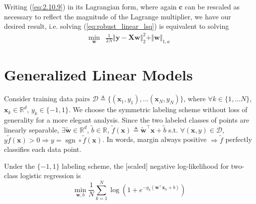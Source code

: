 \documentclass{article}
\numberwithin{equation}{section}
\begin{document}
Writing (\ref{eq:2.10.9}) in its Lagrangian form, where again $ \mathbf{c} $
can be rescaled as necessary to reflect the magnitude of the Lagrange
multiplier, we have our desired result, i.e. solving
(\ref{eq:robust_linear_lsq}) is equivalent to solving
\begin{equation}
    \begin{array}{rl}
        \displaystyle\min_\mathbf{w} &
        \frac{1}{2N}\Vert\mathbf{y} - \mathbf{Xw}\Vert_2^2 +
        \Vert\mathbf{w}\Vert_{1, \mathbf{c}}
    \end{array}
\end{equation}

\section{Generalized Linear Models}



\medskip

Consider training data pairs $ \mathcal{D} \triangleq
\{(\mathbf{x}_1, y_1), \ldots (\mathbf{x}_N, y_N)\} $, where $ \forall k \in
\{1, \ldots N\} $, $ \mathbf{x}_k \in \mathbb{R}^d $, $ y_k \in \{-1, 1\} $.
We choose the symmetric labeling scheme without loss of generality for a more
elegant analysis. Since the two labeled classes of points are linearly
separable, $ \exists \tilde{\mathbf{w}} \in \mathbb{R}^d $,
$ \tilde{b} \in \mathbb{R} $, $ \tilde{f}(\mathbf{x}) \triangleq
\tilde{\mathbf{w}}^\top\mathbf{x} + \tilde{b} $ s.t.
$ \forall (\mathbf{x}, y) \in \mathcal{D} $, $ y\tilde{f}(\mathbf{x}) > 0
\Rightarrow y = \operatorname{sgn} \circ \tilde{f}(\mathbf{x}) $. In words,
margin always positive $ \Rightarrow \tilde{f} $ perfectly classifies
each data point.

\medskip

Under the $ \{-1, 1\} $ labeling scheme, the [scaled] negative log-likelihood
for two-class logistic regression is
\begin{equation} \label{eq:logreg_binary_mle}
    \min_{\mathbf{w}, b}\frac{1}{N}\sum_{k = 1}^N\log\left(
        1 + e^{-y_k\left(\mathbf{w}^\top\mathbf{x}_k + b\right)}
    \right)
\end{equation}
\end{document}
